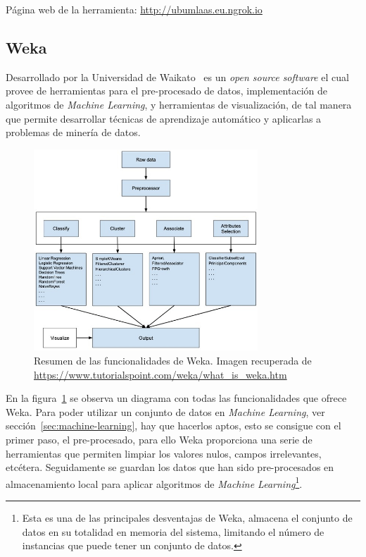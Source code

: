 Página web de la herramienta: \url{http://ubumlaas.eu.ngrok.io}

\subsection{Weka}\label{subsec:Weka}
Desarrollado por la Universidad de Waikato~\cite{witten2005practical} es un \textit{open source software} el cual provee de herramientas para el pre-procesado de datos, implementación de algoritmos de \textit{Machine Learning}, y herramientas de visualización, de tal manera que permite desarrollar técnicas de aprendizaje automático y aplicarlas a problemas de minería de datos. 

\begin{figure}
\centering
\includegraphics[width=0.75\textwidth]{../img/memoria/weka-summary}
\caption[Resumen de las funcionalidades de Weka.]{Resumen de las funcionalidades de Weka. Imagen recuperada de \url{https://www.tutorialspoint.com/weka/what_is_weka.htm}}\label{fig:whatisweka}
\end{figure}

En la figura~\ref{fig:whatisweka} se observa un diagrama con todas las funcionalidades que ofrece Weka. Para poder utilizar un conjunto de datos en \textit{Machine Learning}, ver sección~\ref{sec:machine-learning}, hay que hacerlos aptos, esto se consigue con el primer paso, el pre-procesado, para ello Weka proporciona una serie de herramientas que permiten limpiar los valores nulos, campos irrelevantes, etcétera. Seguidamente se guardan los datos que han sido pre-procesados en almacenamiento local para aplicar algoritmos de \textit{Machine Learning}\footnote{Esta es una de las principales desventajas de Weka, almacena el conjunto de datos en su totalidad en memoria del sistema, limitando el número de instancias que puede tener un conjunto de datos.}.

